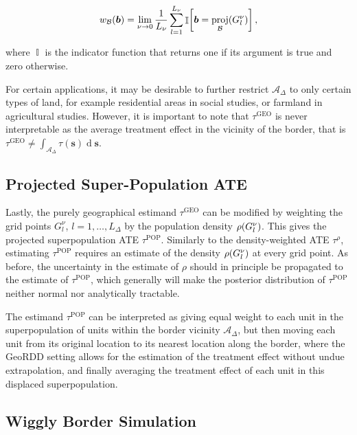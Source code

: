 \documentclass[letter]{article}
\DeclarePairedDelimiter{\parenthesis}{\lparen}{\rparen}
\DeclarePairedDelimiter{\curlybracket}{\lbrack}{\rbrack}
\newcommand{\del}[1]{\parenthesis*{#1}}
\newcommand{\cbr}[1]{\curlybracket*{#1}}
\DeclareMathOperator{\dif}{d}
\DeclareMathOperator{\Ind}{\mathbb{I}}
\newcommand{\area}{\mathcal{A}}
\newcommand{\svec}{\mathbold{s}}
\newcommand{\border}{\mathcal{B}}
\newcommand{\sentinel}{\bm{b}}
\newcommand{\taurho}{\tau^{\rho}}
\newcommand{\taugeo}{\tau^{\mathrm{GEO}}}
\newcommand{\taupop}{\tau^{\mathrm{POP}}}
\DeclareMathOperator{\proj}{proj}
\newcommand{\buffer}{\Delta}
\newcommand{\weightb}{w_{\border}}
\newcommand{\gridres}{\nu}
\newcommand{\grid}{G^\gridres}
\begin{document}
\begin{equation}
    \weightb(\sentinel) = \lim_{\gridres \rightarrow 0}\frac{1}{L_\gridres}\sum_{l=1}^{L_\gridres} \Ind\cbr{\sentinel = \proj_{\border}\del{\grid_l} }\,,
\end{equation}

where \(\Ind\) is the indicator function that returns one if its argument is true and zero otherwise.

For certain applications, it may be desirable to further restrict \(\area_\buffer\) to only certain types of land, for example residential areas in social studies, or farmland in agricultural studies.
However, it is important to note that \(\taugeo\) is never interpretable as the average treatment effect in the vicinity of the border, that is \(\taugeo \neq \int_{\area_\buffer} \tau(\svec) \dif \svec\).
    


    	\subsection{Projected Super-Population ATE}\label{projected-super-population-ate}

Lastly, the purely geographical estimand \(\taugeo\) can be modified by weighting the grid points \(\grid_l\), \(l=1,\dotsc,L_\buffer\) by the population density \(\rho\del{\grid_l}\).
This gives the projected superpopulation ATE \(\taupop\).
Similarly to the density-weighted ATE \(\taurho\), estimating \(\taupop\) requires an estimate of the density \(\rho\del{\grid_l}\) at every grid point.
As before, the uncertainty in the estimate of \(\rho\) should in principle be propagated to the estimate of \(\taupop\), which generally will make the posterior distribution of \(\taupop\) neither normal nor analytically tractable.

The estimand \(\taupop\) can be interpreted as giving equal weight to each unit in the superpopulation of units within the border vicinity \(\area_\buffer\), but then moving each unit from its original location to its nearest location along the border, where the GeoRDD setting allows for the estimation of the treatment effect without undue extrapolation, and finally averaging the treatment effect of each unit in this displaced superpopulation.
    


    	\subsection{Wiggly Border Simulation}\label{wiggly-border-simulation}
\end{document}
